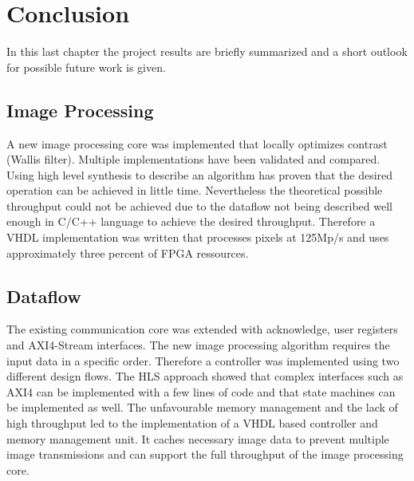 %
%
\chapter{Conclusion}
In this last chapter the project results are briefly summarized and
a short outlook for possible future work is given.

%
%
\section{Image Processing}
A new image processing core was implemented that locally optimizes contrast 
(Wallis filter). Multiple implementations have been validated and compared.
Using high level synthesis to describe an algorithm has proven that the desired
operation can be achieved in little time. Nevertheless the theoretical possible
throughput could not be achieved due to the dataflow not being
described well enough in C/C++ language to achieve the desired throughput.
Therefore a VHDL implementation was written that processes pixels at 125Mp/s and
uses approximately three percent of FPGA ressources.

%
%
\section{Dataflow}
The existing communication core was extended with acknowledge, user registers
and AXI4-Stream interfaces. The new image processing algorithm requires the
input data in a specific order. Therefore a controller was implemented using two
different design flows. The HLS approach showed that complex interfaces such as
AXI4 can be implemented with a few lines of code and that state machines can be
implemented as well. The unfavourable memory management and the lack of high
throughput
led to the implementation of a VHDL based controller and memory management unit.
It caches necessary image data to prevent multiple image transmissions and can
support the full throughput of the image processing core.

